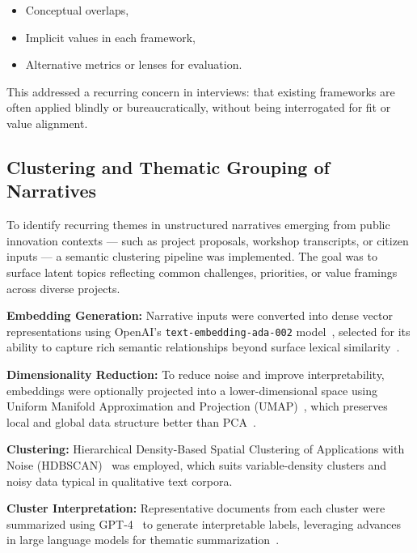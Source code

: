 \begin{itemize}
    \item Conceptual overlaps,
    \item Implicit values in each framework,
    \item Alternative metrics or lenses for evaluation.
\end{itemize}

This addressed a recurring concern in interviews: that existing frameworks are often applied blindly or bureaucratically, without being interrogated for fit or value alignment.

\subsection{Clustering and Thematic Grouping of Narratives}\label{subsec:clustering-and-thematic-grouping-of-narratives}

To identify recurring themes in unstructured narratives emerging from public innovation contexts — such as project proposals, workshop transcripts, or citizen inputs — a semantic clustering pipeline was implemented.
The goal was to surface latent topics reflecting common challenges, priorities, or value framings across diverse projects.

\textbf{Embedding Generation:} Narrative inputs were converted into dense vector representations using OpenAI’s \texttt{text-embedding-ada-002} model~\parencite{OpenAI2023Embedding}, selected for its ability to capture rich semantic relationships beyond surface lexical similarity~\parencite{Reimers2019SentenceBERT}.

\textbf{Dimensionality Reduction:} To reduce noise and improve interpretability, embeddings were optionally projected into a lower-dimensional space using Uniform Manifold Approximation and Projection (UMAP)~\parencite{McInnes2018UMAP}, which preserves local and global data structure better than PCA~\parencite{vanDerMaaten2008tSNE}.

\textbf{Clustering:} Hierarchical Density-Based Spatial Clustering of Applications with Noise (HDBSCAN)~\parencite{Campello2013HDBSCAN} was employed, which suits variable-density clusters and noisy data typical in qualitative text corpora.

\textbf{Cluster Interpretation:} Representative documents from each cluster were summarized using GPT-4~\parencite{OpenAI2023GPT4} to generate interpretable labels, leveraging advances in large language models for thematic summarization~\parencite{Bamman2020LLMTextMining}.

